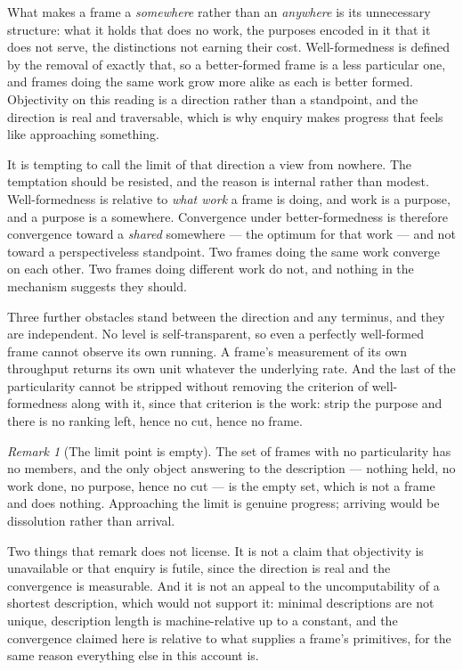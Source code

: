 \documentclass[11pt,a4paper]{article}
\theoremstyle{remark}\newtheorem{remark}[definition]{Remark}
\begin{document}
What makes a frame a \emph{somewhere} rather than an \emph{anywhere} is its unnecessary structure:
what it holds that does no work, the purposes encoded in it that it does not serve, the distinctions
not earning their cost. Well-formedness is defined by the removal of exactly that, so a better-formed
frame is a less particular one, and frames doing the same work grow more alike as each is better
formed. Objectivity on this reading is a direction rather than a standpoint, and the direction is
real and traversable, which is why enquiry makes progress that feels like approaching something.

It is tempting to call the limit of that direction a view from nowhere. The temptation should be resisted, and the reason is internal rather
than modest. Well-formedness is relative to \emph{what work} a frame is doing, and work is a purpose,
and a purpose is a somewhere. Convergence under better-formedness is therefore convergence toward a
\emph{shared} somewhere --- the optimum for that work --- and not toward a perspectiveless standpoint.
Two frames doing the same work converge on each other. Two frames doing different work do not, and
nothing in the mechanism suggests they should.

Three further obstacles stand between the direction and any terminus, and they are independent. No
level is self-transparent, so even a perfectly well-formed frame cannot observe its own running. A
frame's measurement of its own throughput returns its own unit whatever the underlying rate. And the
last of the particularity cannot be stripped without removing the criterion of well-formedness along
with it, since that criterion is the work: strip the purpose and there is no ranking left, hence no
cut, hence no frame.

\begin{remark}[The limit point is empty]\label{rem:empty-limit}
The set of frames with no particularity has no members, and the only object answering to the
description --- nothing held, no work done, no purpose, hence no cut --- is the empty set, which is
not a frame and does nothing. Approaching the limit is genuine progress; arriving would be
dissolution rather than arrival.
\end{remark}

Two things that remark does not license. It is not a claim that objectivity is unavailable or that
enquiry is futile, since the direction is real and the convergence is measurable. And it is not an
appeal to the uncomputability of a shortest description, which would not support it: minimal
descriptions are not unique, description length is machine-relative up to a constant, and the
convergence claimed here is relative to what supplies a frame's primitives, for the same reason
everything else in this account is.
\end{document}
